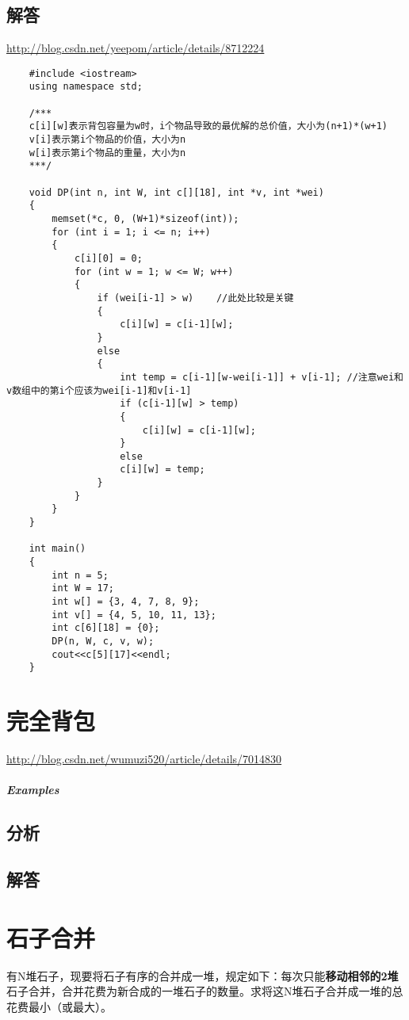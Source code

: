 \documentclass[UTF8,a4paper,12pt]{ctexbook}
\begin{document}
	\subsection{解答}
		\url{http://blog.csdn.net/yeepom/article/details/8712224}
		\begin{lstlisting}
	#include <iostream>  
	using namespace std;  
	
	/*** 
	c[i][w]表示背包容量为w时，i个物品导致的最优解的总价值，大小为(n+1)*(w+1) 
	v[i]表示第i个物品的价值，大小为n 
	w[i]表示第i个物品的重量，大小为n 
	***/  
	
	void DP(int n, int W, int c[][18], int *v, int *wei)  
	{  
		memset(*c, 0, (W+1)*sizeof(int));  
		for (int i = 1; i <= n; i++)  
		{  
			c[i][0] = 0;  
			for (int w = 1; w <= W; w++)  
			{  
				if (wei[i-1] > w)    //此处比较是关键  
				{  
					c[i][w] = c[i-1][w];  
				}  
				else  
				{  
					int temp = c[i-1][w-wei[i-1]] + v[i-1]; //注意wei和v数组中的第i个应该为wei[i-1]和v[i-1]  
					if (c[i-1][w] > temp)  
					{  
						c[i][w] = c[i-1][w];  
					}  
					else   
					c[i][w] = temp;  
				}  
			}  
		}  
	}  
	
	int main()  
	{  
		int n = 5;  
		int W = 17;  
		int w[] = {3, 4, 7, 8, 9};  
		int v[] = {4, 5, 10, 11, 13};  
		int c[6][18] = {0};  
		DP(n, W, c, v, w);  
		cout<<c[5][17]<<endl;  
	}  
		\end{lstlisting}
	
\section{完全背包}
	\url{http://blog.csdn.net/wumuzi520/article/details/7014830}
	\subparagraph{Examples}
	
	\subsection{分析}
	
	\subsection{解答}
	
\section{石子合并}
	有N堆石子，现要将石子有序的合并成一堆，规定如下：每次只能\textbf{移动相邻的2堆}石子合并，合并花费为新合成的一堆石子的数量。求将这N堆石子合并成一堆的总花费最小（或最大）。
	
\end{document}
